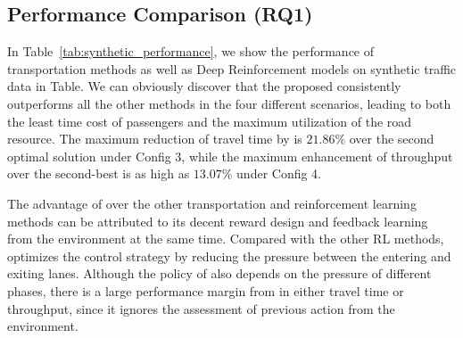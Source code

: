 \subsection{Performance Comparison (RQ1)}
In Table~\ref{tab:synthetic_performance}, we show the performance of transportation methods as well as Deep Reinforcement models on synthetic traffic data in Table. We can obviously discover that the proposed \PressLight consistently outperforms all the other methods in the four different scenarios, leading to both the least time cost of passengers and the maximum utilization of the road resource. The maximum reduction of travel time by \PressLight is $21.86\%$ over the second optimal solution \Maxpressure under Config 3, while the maximum enhancement of throughput over the second-best \Deeplight is as high as $13.07\%$ under Config 4.

The advantage of \PressLight over the other transportation and reinforcement learning methods can be attributed to its decent reward design and feedback learning from the environment at the same time. Compared with the other RL methods, \PressLight optimizes the control strategy by reducing the pressure between the entering and exiting lanes. Although the policy of \Maxpressure also depends on the pressure of different phases, there is a large performance margin from \PressLight in either travel time or throughput, since it ignores the assessment of previous action from the environment.

